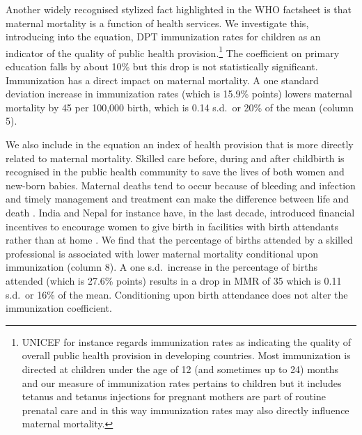 \documentclass{article}[12pt,subeqn]
\begin{document}
\begin{spacing}{1.4}
Another widely recognised stylized fact highlighted in the WHO factsheet is that 
maternal mortality is a function of health services. We investigate this, 
introducing into the equation, DPT immunization rates for children as an indicator 
of the quality of public health provision.\footnote{UNICEF for instance regards 
immunization rates as indicating the quality of overall public health provision 
in developing countries. Most immunization is directed at children under the age 
of 12 (and sometimes up to 24) months and our measure of immunization rates 
pertains to children but it includes tetanus and tetanus injections for pregnant 
mothers are part of routine prenatal care and in this way immunization rates may
also directly influence maternal mortality.} The coefficient on primary 
education falls by about 10\% but this drop is not statistically 
significant. Immunization has a direct impact on maternal mortality. A one 
standard deviation increase in immunization rates (which is 15.9\% points) lowers 
maternal mortality by 45 per 100,000 birth, which is 0.14 s.d.\ or 20\% of the 
mean (column 5).

We also include in the equation an index of health provision that is more 
directly related to maternal mortality. Skilled care before, during and after 
childbirth is recognised in the public health community to save the lives of both 
women and new-born babies. Maternal deaths tend to occur because of bleeding and
infection and timely management and treatment can make the difference between life 
and death \citep{WHO2012}. India and Nepal for instance have, in the last decade, 
introduced financial incentives to encourage women to give birth in facilities 
with birth attendants rather than at home \citep{Milleretal2012,
PowellJacksonHanson2012}. We find that the percentage of births attended by a 
skilled professional is associated with lower maternal mortality conditional upon 
immunization (column 8). A one s.d.\ increase in the percentage of births attended 
(which is 27.6\% points) results in a drop in MMR of 35 which is 0.11 s.d.\ or 16\% 
of the mean. Conditioning upon birth attendance does not alter the immunization 
coefficient.


\end{spacing}
\end{document}

